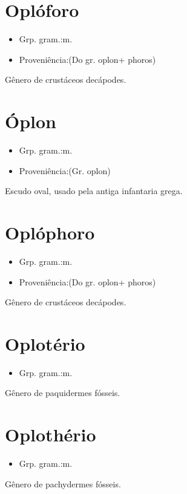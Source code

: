 \section{Oplóforo}
\begin{itemize}
\item {Grp. gram.:m.}
\end{itemize}
\begin{itemize}
\item {Proveniência:(Do gr. \textunderscore oplon\textunderscore  + \textunderscore phoros\textunderscore )}
\end{itemize}
Gênero de crustáceos decápodes.
\section{Óplon}
\begin{itemize}
\item {Grp. gram.:m.}
\end{itemize}
\begin{itemize}
\item {Proveniência:(Gr. \textunderscore oplon\textunderscore )}
\end{itemize}
Escudo oval, usado pela antiga infantaria grega.
\section{Oplóphoro}
\begin{itemize}
\item {Grp. gram.:m.}
\end{itemize}
\begin{itemize}
\item {Proveniência:(Do gr. \textunderscore oplon\textunderscore  + \textunderscore phoros\textunderscore )}
\end{itemize}
Gênero de crustáceos decápodes.
\section{Oplotério}
\begin{itemize}
\item {Grp. gram.:m.}
\end{itemize}
Gênero de paquidermes fósseis.
\section{Oplothério}
\begin{itemize}
\item {Grp. gram.:m.}
\end{itemize}
Gênero de pachydermes fósseis.
